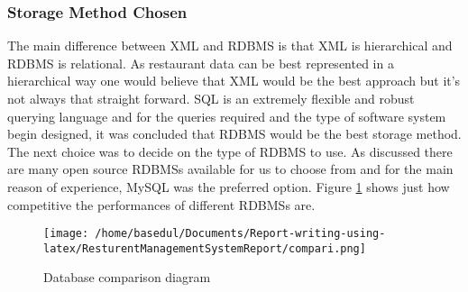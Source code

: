 \documentclass[12pt,a4paper]{article}
\begin{document}
\subsubsection{Storage Method Chosen}
	The main difference between XML and RDBMS is that XML is hierarchical and RDBMS is relational.
As restaurant data can be best represented in a hierarchical way one would believe that XML would be
the best approach but it’s not always that straight forward. SQL is an extremely flexible and robust querying language and for the queries required and the type of software system begin designed, it was
concluded that RDBMS would be the best storage method.
The next choice was to decide on the type of RDBMS to use. As discussed there are many open
source RDBMSs available for us to choose from and for the main reason of experience, MySQL was the
preferred option. Figure \ref{fig:compari} shows just how competitive the performances of different RDBMSs are.
\begin{figure}[H]
		\centering
		\texttt{[image: /home/basedul/Documents/Report-writing-using-latex/ResturentManagementSystemReport/compari.png]}
		\caption{Database comparison diagram \cite{Ref:6}}
		\label{fig:compari} 
	\end{figure}
\end{document}
